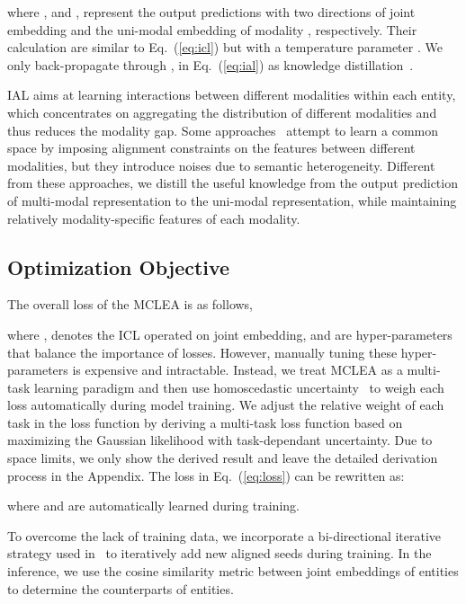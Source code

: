 \documentclass[11pt]{article}
\begin{document}
where ,  and ,  represent the output predictions with two directions of joint embedding and the uni-modal embedding of modality , respectively.
Their calculation are similar to Eq.~(\ref{eq:icl}) but with a temperature parameter .
We only back-propagate through ,  in Eq.~(\ref{eq:ial}) as knowledge distillation~\cite{hinton2015distilling}.

IAL aims at learning interactions between different modalities within each entity, which concentrates on aggregating the distribution of different modalities and thus reduces the modality gap.
Some approaches~\cite{zhang2019multi,chen2020mmea} attempt to learn a common space by imposing alignment constraints on the features between different modalities, but they introduce noises due to semantic heterogeneity. 
Different from these approaches, we distill the useful knowledge from the output prediction of multi-modal representation to the uni-modal representation, while maintaining relatively modality-specific features of each modality.


\subsection{Optimization Objective}
\label{sec:objective}
The overall loss of the MCLEA is as follows,

where ,  denotes the ICL operated on joint embedding,  and  are hyper-parameters that balance the importance of losses.
However, manually tuning these hyper-parameters is expensive and intractable.
Instead, we treat MCLEA as a multi-task learning paradigm and then use homoscedastic uncertainty~\cite{kendall2018multi} to weigh each loss automatically during model training.
We adjust the relative weight of each task in the loss function by deriving a multi-task loss function based on maximizing the Gaussian likelihood with task-dependant uncertainty.
Due to space limits, we only show the derived result and leave the detailed derivation process in the Appendix. The loss in Eq.~(\ref{eq:loss}) can be rewritten as:

where  and  are automatically learned during training.


To overcome the lack of training data, we incorporate a bi-directional iterative strategy used in~\cite{liu2021visual} to iteratively add new aligned seeds during training.
In the inference, we use the cosine similarity metric between joint embeddings of entities to determine the counterparts of entities.
\end{document}
